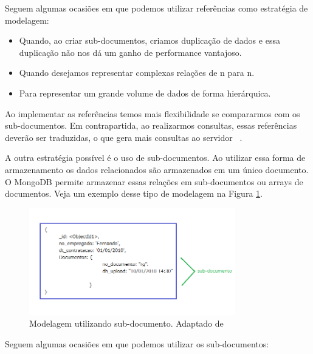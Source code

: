 Seguem algumas ocasiões em que podemos utilizar referências como estratégia de modelagem:

\begin{itemize}
	\item Quando, ao criar sub-documentos, criamos duplicação de dados e essa duplicação não nos dá um ganho de performance vantajoso.
	\item Quando desejamos representar complexas relações de n para n.
	\item Para representar um grande volume de dados de forma hierárquica.
\end{itemize}

Ao implementar as referências temos mais flexibilidade se compararmos com os sub-documentos. Em contrapartida, ao realizarmos consultas, essas referências deverão ser traduzidas, o que gera mais consultas ao servidor ~\cite{Orendanalysisand}.


A outra estratégia possível é o uso de sub-documentos. Ao utilizar essa forma de armazenamento os dados relacionados são armazenados em um único documento. O MongoDB permite armazenar essas relações em sub-documentos ou arrays de documentos. Veja um exemplo desse tipo de modelagem na Figura \ref{fig:subdocumento}.

	\begin{figure}[!htbp]
		\begin{center}
			\includegraphics[width=0.8\textwidth]{subdocumento}
		\end{center}
		\caption{ Modelagem utilizando sub-documento. Adaptado de ~\cite{sitemongodb}}
		\label{fig:subdocumento}
	\end{figure}

Seguem algumas ocasiões em que podemos utilizar os sub-documentos:

